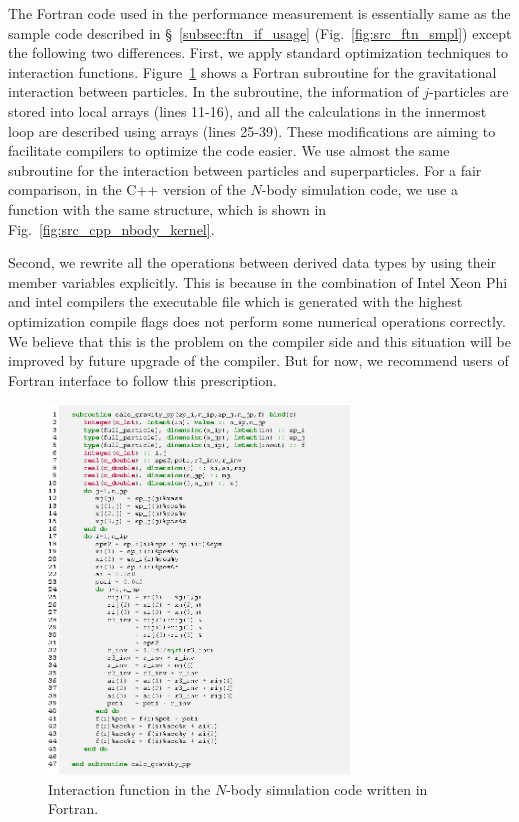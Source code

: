 \documentclass[twocolumn,useamsfonts]{pasj01}
\begin{document}
The Fortran code used in the performance measurement is essentially same as the sample code described in \S~\ref{subsec:ftn_if_usage} (Fig.~\ref{fig:src_ftn_smpl}) except the following two differences. First, we apply standard optimization techniques to interaction functions. Figure~\ref{fig:src_ftn_nbody_kernel} shows a Fortran subroutine for the gravitational interaction between particles. In the subroutine, the information of $j$-particles are stored into local arrays (lines 11-16), and all the calculations in the innermost loop are described using arrays (lines 25-39). These modifications are aiming to facilitate compilers to optimize the code easier. We use almost the same subroutine for the interaction between particles and superparticles. For a fair comparison, in the C++ version of the $N$-body simulation code, we use a function with the same structure, which is shown in Fig.~\ref{fig:src_cpp_nbody_kernel}.

Second, we rewrite all the operations between derived data types by using their member variables explicitly. This is because in the combination of Intel Xeon Phi and intel compilers the executable file which is generated with the highest optimization compile flags does not perform some numerical operations correctly. We believe that this is the problem on the compiler side and this situation will be improved by future upgrade of the compiler. But for now, we recommend users of Fortran interface to follow this prescription.

\begin{figure}[h]
\begin{center}
\includegraphics[width=8cm]{figures/src_ftn_nbody_kernel}
\end{center}
\caption{Interaction function in the $N$-body simulation code written in Fortran.}
\label{fig:src_ftn_nbody_kernel}  
\end{figure}
\end{document}
